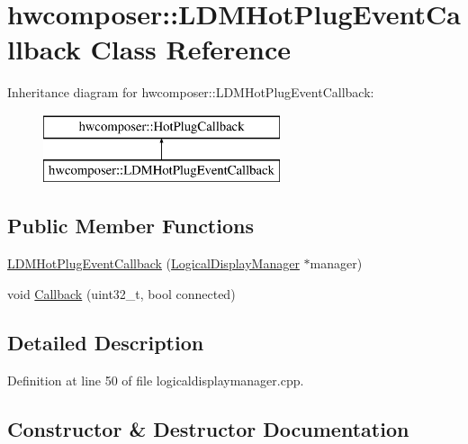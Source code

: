 \hypertarget{classhwcomposer_1_1LDMHotPlugEventCallback}{}\section{hwcomposer\+:\+:L\+D\+M\+Hot\+Plug\+Event\+Callback Class Reference}
\label{classhwcomposer_1_1LDMHotPlugEventCallback}
Inheritance diagram for hwcomposer\+:\+:L\+D\+M\+Hot\+Plug\+Event\+Callback\+:\begin{figure}[H]
\begin{center}
\leavevmode
\includegraphics[height=2.000000cm]{classhwcomposer_1_1LDMHotPlugEventCallback}
\end{center}
\end{figure}
\subsection*{Public Member Functions}
\begin{DoxyCompactItemize}
\item 
\mbox{\hyperlink{classhwcomposer_1_1LDMHotPlugEventCallback_a81c6b48e6b3ac749d7810c8d47d7c4e8}{L\+D\+M\+Hot\+Plug\+Event\+Callback}} (\mbox{\hyperlink{classhwcomposer_1_1LogicalDisplayManager}{Logical\+Display\+Manager}} $\ast$manager)
\item 
void \mbox{\hyperlink{classhwcomposer_1_1LDMHotPlugEventCallback_ab5e17c96c17c3707c3ef98d856807822}{Callback}} (uint32\+\_\+t, bool connected)
\end{DoxyCompactItemize}


\subsection{Detailed Description}


Definition at line 50 of file logicaldisplaymanager.\+cpp.



\subsection{Constructor \& Destructor Documentation}
\mbox{\label{classhwcomposer_1_1LDMHotPlugEventCallback_a81c6b48e6b3ac749d7810c8d47d7c4e8}} 
